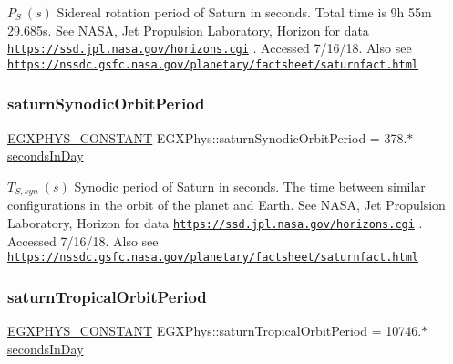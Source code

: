 $ P_{S} \ (s)$ Sidereal rotation period of Saturn in seconds. Total time is 9h 55m 29.\+685s. See N\+A\+SA, Jet Propulsion Laboratory, Horizon for data \href{https://ssd.jpl.nasa.gov/horizons.cgi}{\tt https\+://ssd.\+jpl.\+nasa.\+gov/horizons.\+cgi} . Accessed 7/16/18. Also see \href{https://nssdc.gsfc.nasa.gov/planetary/factsheet/saturnfact.html}{\tt https\+://nssdc.\+gsfc.\+nasa.\+gov/planetary/factsheet/saturnfact.\+html} \mbox{\label{group___e_g_x_phys-_constants-_astrophysics-_solar_system-_saturn-_orbit_ga22ca86e26fcfc5edef67f249703c532f}} 
\subsubsection{\texorpdfstring{saturn\+Synodic\+Orbit\+Period}{saturnSynodicOrbitPeriod}}
{\footnotesize\ttfamily \mbox{\hyperlink{group___e_g_x_phys-_constants-_macros_ga76980d288494ce1714c9ac68a95ba702}{E\+G\+X\+P\+H\+Y\+S\+\_\+\+C\+O\+N\+S\+T\+A\+NT}} E\+G\+X\+Phys\+::saturn\+Synodic\+Orbit\+Period = 378.$\ast$\mbox{\hyperlink{namespace_e_g_x_phys_a93d2a00d75411b58cbf63ab3fd1f8bc2}{seconds\+In\+Day}}}

$ T_{S,syn} \ (s)$ Synodic period of Saturn in seconds. The time between similar configurations in the orbit of the planet and Earth. See N\+A\+SA, Jet Propulsion Laboratory, Horizon for data \href{https://ssd.jpl.nasa.gov/horizons.cgi}{\tt https\+://ssd.\+jpl.\+nasa.\+gov/horizons.\+cgi} . Accessed 7/16/18. Also see \href{https://nssdc.gsfc.nasa.gov/planetary/factsheet/saturnfact.html}{\tt https\+://nssdc.\+gsfc.\+nasa.\+gov/planetary/factsheet/saturnfact.\+html} \mbox{\label{group___e_g_x_phys-_constants-_astrophysics-_solar_system-_saturn-_orbit_ga3c3ced59bd82dd2858e7b84a4b218f54}} 
\subsubsection{\texorpdfstring{saturn\+Tropical\+Orbit\+Period}{saturnTropicalOrbitPeriod}}
{\footnotesize\ttfamily \mbox{\hyperlink{group___e_g_x_phys-_constants-_macros_ga76980d288494ce1714c9ac68a95ba702}{E\+G\+X\+P\+H\+Y\+S\+\_\+\+C\+O\+N\+S\+T\+A\+NT}} E\+G\+X\+Phys\+::saturn\+Tropical\+Orbit\+Period = 10746.$\ast$\mbox{\hyperlink{namespace_e_g_x_phys_a93d2a00d75411b58cbf63ab3fd1f8bc2}{seconds\+In\+Day}}}

